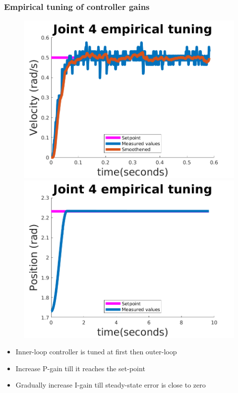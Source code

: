 \documentclass{beamer}
\begin{document}
\begin{frame}
	\frametitle{Empirical tuning of controller gains}
\begin{figure}
\centering
\begin{minipage}{.45\textwidth}
  \centering
  \includegraphics[trim=0 0 0 0,width=0.9\linewidth]{images/joint4_innerloop_0pt5rads}
\end{minipage}
\begin{minipage}{.45\textwidth}
  \centering
  \includegraphics[trim=0 0 0 0,width=0.9\linewidth]{images/joint4_outerloop_0pt5rad}
\end{minipage}
\end{figure}	
\begin{itemize}
\item Inner-loop controller is tuned at first then outer-loop
\item Increase P-gain till it reaches the set-point
\item Gradually increase I-gain till steady-state error is close to zero
\end{itemize}
\end{frame}
\end{document}
